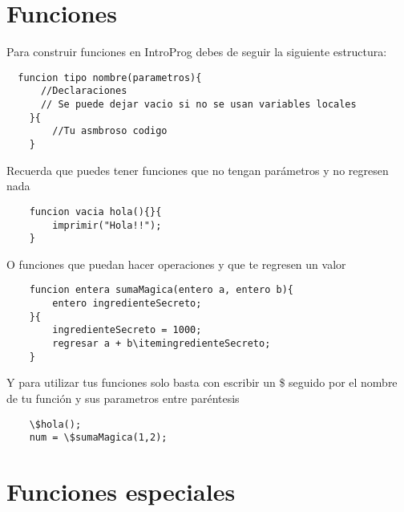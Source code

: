 \section{Funciones}

 Para construir funciones en IntroProg debes de seguir la siguiente estructura:

\begin{lstlisting}
  funcion tipo nombre(parametros){
      //Declaraciones
      // Se puede dejar vacio si no se usan variables locales
    }{
        //Tu asmbroso codigo
    }
\end{lstlisting}

Recuerda que puedes tener funciones que no tengan parámetros y no regresen nada

\begin{lstlisting}
    funcion vacia hola(){}{
        imprimir("Hola!!");
    }
\end{lstlisting}

O funciones que puedan hacer operaciones y que te regresen un valor
\begin{lstlisting}
    funcion entera sumaMagica(entero a, entero b){
        entero ingredienteSecreto;
    }{
        ingredienteSecreto = 1000;
        regresar a + b\itemingredienteSecreto;
    }
\end{lstlisting}
Y para utilizar tus funciones solo basta con escribir un \$ seguido por el nombre de tu función y sus parametros entre paréntesis

\begin{lstlisting}
    \$hola();
    num = \$sumaMagica(1,2);
\end{lstlisting}

\section{Funciones especiales}

